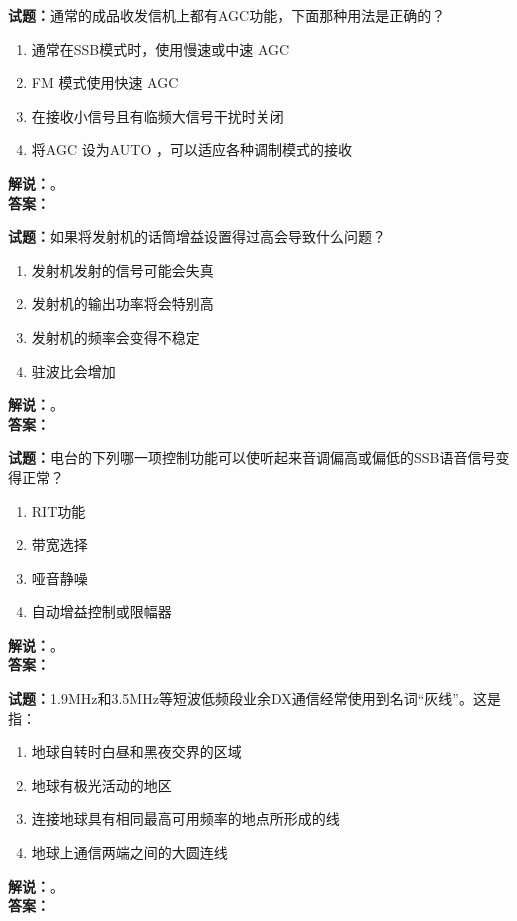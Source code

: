 \documentclass{ctexbook}
\begin{document}
\noindent\textbf{试题：}通常的成品收发信机上都有AGC功能，下面那种用法是正确的？
\begin{enumerate}[leftmargin=3em]
  \item 通常在SSB模式时，使用慢速或中速 AGC
  \item FM 模式使用快速 AGC
  \item 在接收小信号且有临频大信号干扰时关闭
  \item 将AGC 设为AUTO ，可以适应各种调制模式的接收
\end{enumerate}
\noindent\textbf{解说：}\textbf{}。\\\noindent\textbf{答案：}

\vspace{\baselineskip}

\noindent\textbf{试题：}如果将发射机的话筒增益设置得过高会导致什么问题？
\begin{enumerate}[leftmargin=3em]
  \item 发射机发射的信号可能会失真
  \item 发射机的输出功率将会特别高
  \item 发射机的频率会变得不稳定
  \item 驻波比会增加
\end{enumerate}
\noindent\textbf{解说：}\textbf{}。\\\noindent\textbf{答案：}

\vspace{\baselineskip}

\noindent\textbf{试题：}电台的下列哪一项控制功能可以使听起来音调偏高或偏低的SSB语音信号变得正常？
\begin{enumerate}[leftmargin=3em]
  \item RIT功能
  \item 带宽选择
  \item 哑音静噪
  \item 自动增益控制或限幅器
\end{enumerate}
\noindent\textbf{解说：}\textbf{}。\\\noindent\textbf{答案：}

\vspace{\baselineskip}

\noindent\textbf{试题：}1.9\unit{\MHz}和3.5\unit{\MHz}等短波低频段业余DX通信经常使用到名词“灰线”。这是指：
\begin{enumerate}[leftmargin=3em]
  \item 地球自转时白昼和黑夜交界的区域
  \item 地球有极光活动的地区
  \item 连接地球具有相同最高可用频率的地点所形成的线
  \item 地球上通信两端之间的大圆连线
\end{enumerate}
\noindent\textbf{解说：}\textbf{}。\\\noindent\textbf{答案：}
\end{document}
